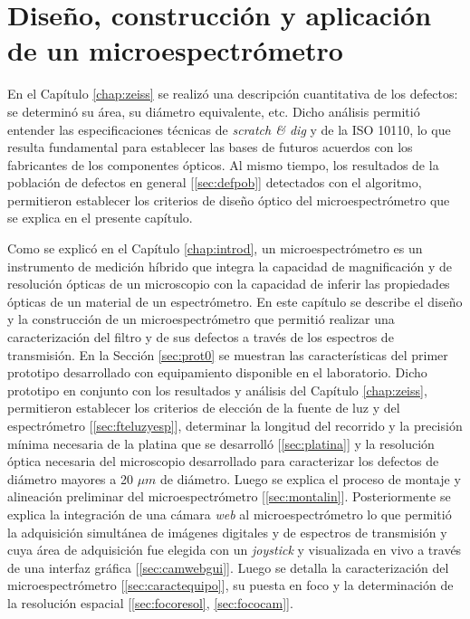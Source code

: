 \singlespacing
\chapter{Diseño, construcción y aplicación de un microespectrómetro}
\label{chap:microsp}

\hspace{0.5cm}En el Capítulo \ref{chap:zeiss} se realizó una descripción cuantitativa de los defectos: se determinó su área, su diámetro equivalente, etc. Dicho análisis permitió entender las especificaciones técnicas de \textit{scratch \& dig} y de la ISO 10110, lo que resulta fundamental para establecer las bases de futuros acuerdos con los fabricantes de los componentes ópticos. Al mismo tiempo, los resultados de la población de defectos en general [\ref{sec:defpob}] detectados con el algoritmo, permitieron establecer los criterios de diseño óptico del microespectrómetro que se explica en el presente capítulo.

Como se explicó en el Capítulo \ref{chap:introd}, un microespectrómetro es un instrumento de medición híbrido que integra la capacidad de magnificación y de resolución ópticas de un microscopio con la capacidad de inferir las propiedades ópticas de un material de un espectrómetro. En este capítulo se describe el diseño y la construcción de un microespectrómetro que permitió realizar una caracterización del filtro y de sus defectos a través de los espectros de transmisión. En la Sección \ref{sec:prot0} se muestran las características del primer prototipo desarrollado con equipamiento disponible en el laboratorio. Dicho prototipo en conjunto con los resultados y análisis del Capítulo \ref{chap:zeiss}, permitieron establecer los criterios de elección de la fuente de luz y del espectrómetro [\ref{sec:fteluzyesp}], determinar la longitud del recorrido y la precisión mínima necesaria de la platina que se desarrolló [\ref{sec:platina}] y la resolución óptica necesaria del microscopio desarrollado para caracterizar los defectos de diámetro mayores a 20 $\mu m$ de diámetro. Luego se explica el proceso de montaje y alineación preliminar del microespectrómetro [\ref{sec:montalin}]. Posteriormente se explica la integración de una cámara \textit{web} al microespectrómetro lo que permitió la adquisición simultánea de imágenes digitales y de espectros de transmisión y cuya área de adquisición fue elegida con un \textit{joystick} y visualizada en vivo a través de una interfaz gráfica [\ref{sec:camwebgui}]. Luego se detalla la caracterización del microespectrómetro [\ref{sec:caractequipo}], su puesta en foco y la determinación de la resolución espacial [\ref{sec:focoresol}, \ref{sec:fococam}].

